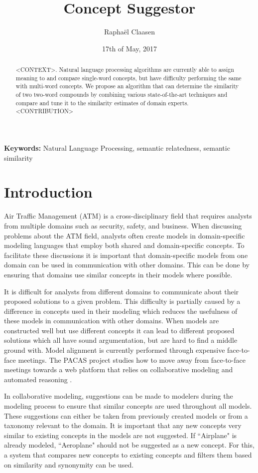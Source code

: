 \documentclass{article}
\title{Concept Suggestor}
\date{17th of May, 2017}
\author{Rapha\"el Claasen}
\begin{document}
\maketitle

\begin{abstract}
<CONTEXT>. Natural language processing algorithms are currently able to assign meaning to and compare single-word concepts, but have difficulty performing the same with multi-word concepts. We propose an algorithm that can determine the similarity of two two-word compounds by combining various state-of-the-art techniques and compare and tune it to the similarity estimates of domain experts. <CONTRIBUTION>
\end{abstract}

{\bf Keywords:} Natural Language Processing, semantic relatedness, semantic similarity

\section{Introduction} \label{sec:introduction}

Air Traffic Management (ATM) is a cross-disciplinary field that requires analysts from multiple domains such as security, safety, and business. When discussing problems about the ATM field, analysts often create models in domain-specific modeling languages that employ both shared and domain-specific concepts. To facilitate these discussions it is important that domain-specific models from one domain can be used in communication with other domains. This can be done by ensuring that domains use similar concepts in their models where possible.

It is difficult for analysts from different domains to communicate about their proposed solutions to a given problem. This difficulty is partially caused by a difference in concepts used in their modeling which reduces the usefulness of these models in communication with other domains. When models are constructed well but use different concepts it can lead to different proposed solutions which all have sound argumentation, but are hard to find a middle ground with. Model alignment is currently performed through expensive face-to-face meetings. The PACAS project studies how to move away from face-to-face meetings towards a web platform that relies on collaborative modeling and automated reasoning \cite{aydemir2017towards}.

In collaborative modeling, suggestions can be made to modelers during the modeling process to ensure that similar concepts are used throughout all models. These suggestions can either be taken from previously created models or from a taxonomy relevant to the domain. 
It is important that any new concepts very similar to existing concepts in the models are not suggested. If ``Airplane" is already modeled, ``Aeroplane" should not be suggested as a new concept. For this, a system that compares new concepts to existing concepts and filters them based on similarity and synonymity can be used.
\end{document}
